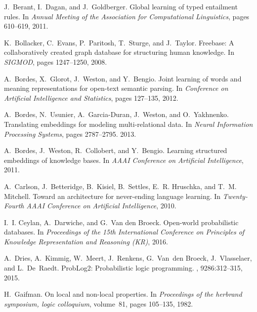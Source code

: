 \documentclass{article}
\begin{document}
\begin{thebibliography}{10}

J.~Berant, I.~Dagan, and J.~Goldberger.
\newblock Global learning of typed entailment rules.
\newblock In {\em Annual Meeting of the Association for Computational
  Linguistics}, pages 610--619, 2011.

K.~Bollacker, C.~Evans, P.~Paritosh, T.~Sturge, and J.~Taylor.
\newblock Freebase: A collaboratively created graph database for structuring
  human knowledge.
\newblock In {\em SIGMOD}, pages 1247--1250, 2008.

A.~Bordes, X.~Glorot, J.~Weston, and Y.~Bengio.
\newblock Joint learning of words and meaning representations for open-text
  semantic parsing.
\newblock In {\em Conference on Artificial Intelligence and Statistics}, pages
  127--135, 2012.

A.~Bordes, N.~Usunier, A.~Garcia-Duran, J.~Weston, and O.~Yakhnenko.
\newblock Translating embeddings for modeling multi-relational data.
\newblock In {\em Neural Information Processing Systems}, pages 2787--2795.
  2013.

A.~Bordes, J.~Weston, R.~Collobert, and Y.~Bengio.
\newblock Learning structured embeddings of knowledge bases.
\newblock In {\em AAAI Conference on Artificial Intelligence}, 2011.

A.~Carlson, J.~Betteridge, B.~Kisiel, B.~Settles, E.~R. Hruschka, and T.~M.
  Mitchell.
\newblock Toward an architecture for never-ending language learning.
\newblock In {\em Twenty-Fourth AAAI Conference on Artificial Intelligence},
  2010.

I.~I. Ceylan, A.~Darwiche, and G.~{Van den Broeck}.
\newblock Open-world probabilistic databases.
\newblock In {\em Proceedings of the 15th International Conference on
  Principles of Knowledge Representation and Reasoning (KR)}, 2016.

A.~Dries, A.~Kimmig, W.~Meert, J.~Renkens, G.~Van~den Broeck, J.~Vlasselaer,
  and L.~De~Raedt.
\newblock Prob{L}og2: {P}robabilistic logic programming.
, 9286:312--315, 2015.

H.~Gaifman.
\newblock On local and non-local properties.
\newblock In {\em Proceedings of the herbrand symposium, logic colloquium},
  volume~81, pages 105--135, 1982.


\end{thebibliography}
\end{document}
